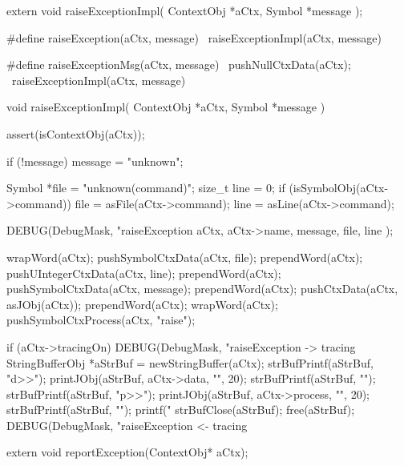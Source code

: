 \startCHeader
extern void raiseExceptionImpl(
  ContextObj *aCtx,
  Symbol     *message
);

#define raiseException(aCtx, message) \
  raiseExceptionImpl(aCtx, message)

#define raiseExceptionMsg(aCtx, message)  \
  pushNullCtxData(aCtx);                  \
  raiseExceptionImpl(aCtx, message)
\stopCHeader

\startCCode
void raiseExceptionImpl(
  ContextObj *aCtx,
  Symbol     *message
) {
  assert(isContextObj(aCtx));

  if (!message) message = "unknown";

  Symbol *file = "unknown(command)";
  size_t  line = 0;
  if (isSymbolObj(aCtx->command)) {
    file = asFile(aCtx->command);
    line = asLine(aCtx->command);
  }

  DEBUG(DebugMask, "raiseException %
    aCtx, aCtx->name, message, file, line
  );

  wrapWord(aCtx);
  pushSymbolCtxData(aCtx, file);
  prependWord(aCtx);
  pushUIntegerCtxData(aCtx, line);
  prependWord(aCtx);
  pushSymbolCtxData(aCtx, message);
  prependWord(aCtx);
  pushCtxData(aCtx, asJObj(aCtx));
  prependWord(aCtx);
  wrapWord(aCtx);
  pushSymbolCtxProcess(aCtx, "raise");
  
  if (aCtx->tracingOn) {
    DEBUG(DebugMask, "raiseException -> tracing%
    StringBufferObj *aStrBuf = newStringBuffer(aCtx);
    strBufPrintf(aStrBuf, "d>>");
    printJObj(aStrBuf, aCtx->data, "", 20);
    strBufPrintf(aStrBuf, "\n");
    strBufPrintf(aStrBuf, "p>>");
    printJObj(aStrBuf, aCtx->process, "", 20);
    strBufPrintf(aStrBuf, "\n");
    printf("%
    strBufClose(aStrBuf);
    free(aStrBuf);
    DEBUG(DebugMask, "raiseException <- tracing%
  }
}
\stopCCode

\startCHeader
extern void reportException(ContextObj* aCtx);
\stopCHeader

